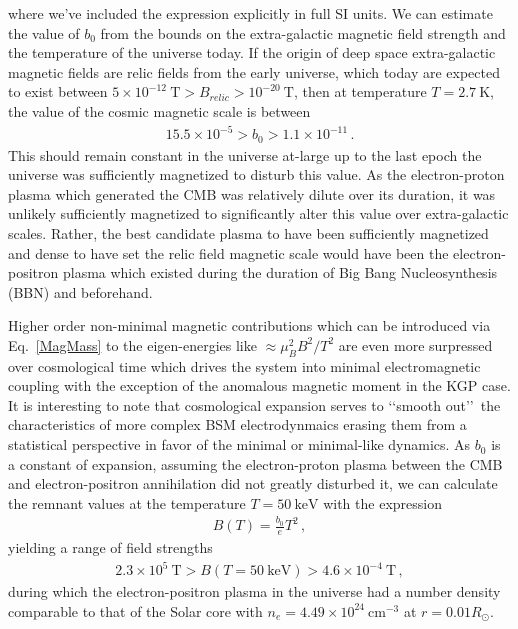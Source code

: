 \documentclass[
aps,
pra,
showpacs,
preprintnumbers,
amsmath,
amssymb,
footinbib
]{revtex4-2}
\newcommand*{\req}[1]{Eq.~{\eqref{#1}}}
\begin{document}
where we've included the expression explicitly in full SI units. We can estimate the value of $b_{0}$ from the bounds on the extra-galactic magnetic field strength and the temperature of the universe today.  If the origin of deep space extra-galactic magnetic fields are relic fields from the early universe, which today are expected to exist between $5\times10^{-12}\ \mathrm{T}>B_{relic}>10^{-20}\ \mathrm{T}$, then at temperature $T=2.7\ \mathrm{K}$, the value of the cosmic magnetic scale is between
\begin{alignat}{1}
    \label{BoScale} 5.5\times10^{-5}>b_{0}>1.1\times10^{-11}\,.
\end{alignat}
This should remain constant in the universe at-large up to the last epoch the universe was sufficiently magnetized to disturb this value. As the electron-proton plasma which generated the CMB was relatively dilute over its duration, it was unlikely sufficiently magnetized to significantly alter this value over extra-galactic scales. Rather, the best candidate plasma to have been sufficiently magnetized and dense to have set the relic field magnetic scale would have been the electron-positron plasma which existed during the duration of Big Bang Nucleosynthesis (BBN) and beforehand.

Higher order non-minimal magnetic contributions which can be introduced via \req{MagMass} to the eigen-energies like $\approx\mu_{B}^{2}B^{2}/T^{2}$ are even more surpressed over cosmological time which drives the system into minimal electromagnetic coupling with the exception of the anomalous magnetic moment in the KGP case. It is interesting to note that cosmological expansion serves to \lq\lq smooth out\rq\rq\ the characteristics of more complex BSM electrodynmaics erasing them from a statistical perspective in favor of the minimal or minimal-like dynamics. As $b_0$ is a constant of expansion, assuming the electron-proton plasma between the CMB and electron-positron annihilation did not greatly disturbed it, we can calculate the remnant values at the temperature $T=50\ \mathrm{keV}$ with the expression
\begin{align}
  \label{BBNFields} B(T)=\frac{b_{0}}{e}T^{2}\,,
\end{align}
yielding a range of field strengths
\begin{align}
  \label{BBNRange} 2.3\times10^{5}\ \mathrm{T}>B(T=50\ \mathrm{keV})>4.6\times10^{-4}\ \mathrm{T}\,,
\end{align}
during which the electron-positron plasma in the universe had a number density comparable to that of the Solar core with $n_{e}=4.49\times10^{24}\ \mathrm{cm}^{-3}$ at $r=0.01R_{\odot}$.
\end{document}

